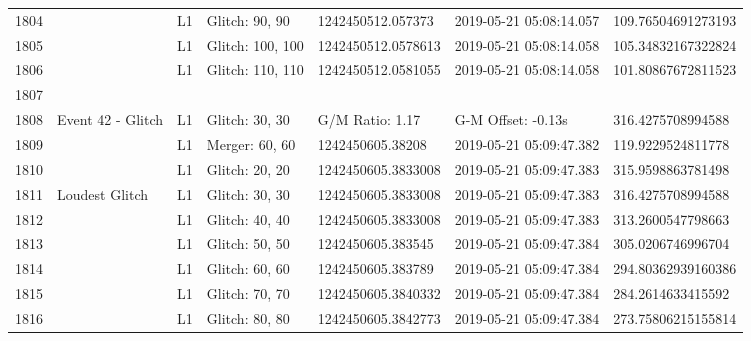 \begin{longtable}{lllllll}
1804 &                                                    &       L1 &    Glitch: 90, 90 &   1242450512.057373 &  2019-05-21 05:08:14.057 &  109.76504691273193 \\
1805 &                                                    &       L1 &  Glitch: 100, 100 &  1242450512.0578613 &  2019-05-21 05:08:14.058 &  105.34832167322824 \\
1806 &                                                    &       L1 &  Glitch: 110, 110 &  1242450512.0581055 &  2019-05-21 05:08:14.058 &  101.80867672811523 \\
1807 &                                                    &          &                   &                     &                          &                     \\
1808 &                                  Event 42 - Glitch &       L1 &    Glitch: 30, 30 &     G/M Ratio: 1.17 &       G-M Offset: -0.13s &   316.4275708994588 \\
1809 &                                                    &       L1 &    Merger: 60, 60 &    1242450605.38208 &  2019-05-21 05:09:47.382 &   119.9229524811778 \\
1810 &                                                    &       L1 &    Glitch: 20, 20 &  1242450605.3833008 &  2019-05-21 05:09:47.383 &   315.9598863781498 \\
1811 &                                     Loudest Glitch &       L1 &    Glitch: 30, 30 &  1242450605.3833008 &  2019-05-21 05:09:47.383 &   316.4275708994588 \\
1812 &                                                    &       L1 &    Glitch: 40, 40 &  1242450605.3833008 &  2019-05-21 05:09:47.383 &   313.2600547798663 \\
1813 &                                                    &       L1 &    Glitch: 50, 50 &   1242450605.383545 &  2019-05-21 05:09:47.384 &   305.0206746996704 \\
1814 &                                                    &       L1 &    Glitch: 60, 60 &   1242450605.383789 &  2019-05-21 05:09:47.384 &  294.80362939160386 \\
1815 &                                                    &       L1 &    Glitch: 70, 70 &  1242450605.3840332 &  2019-05-21 05:09:47.384 &   284.2614633415592 \\
1816 &                                                    &       L1 &    Glitch: 80, 80 &  1242450605.3842773 &  2019-05-21 05:09:47.384 &  273.75806215155814 \\

\end{longtable}
